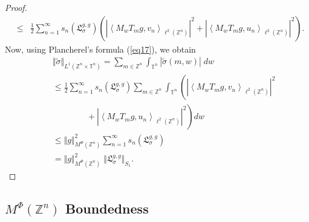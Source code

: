 \documentclass[a4paper,11pt, reqno]{amsart}
\theoremstyle{plain}
\theoremstyle{definition}
\theoremstyle{remark}
\def \Z{{\mathbb Z}}
\def \T{{\mathbb T}}
\begin{document}
\begin{proof}
\begin{eqnarray*}
& \leq & \frac{1}{2} \sum_{n=1}^{\infty} s_n(\mathfrak{L}^{g, g}_{\sigma}) \left( \left| \left\langle  M_w T_m g, v_n \right\rangle_{\ell^2(\Z^n)}  \right|^2 + \left| \left\langle  M_w T_m g, u_n  \right\rangle_{\ell^2(\Z^n)} \right|^2 \right). 
\end{eqnarray*}  
Now, using Plancherel's formula (\ref{eq17}), we obtain
\begin{eqnarray*}
&& \Vert \tilde{\sigma} \Vert_{L^1(\Z^n \times \T^n)} 
= \sum_{m \in \Z^n}  \int_{\T^n} |\tilde{\sigma}(m, w)| \; dw  \\
&& \leq \frac{1}{2} \sum_{n=1}^{\infty} s_n(\mathfrak{L}^{g, g}_{\sigma}) \sum_{m \in \Z^n} \int_{\T^n} \left(  \left| \left\langle  M_w T_m g, v_n \right\rangle_{\ell^2(\Z^n)} \right|^2  \right. \\
&& \qquad \qquad   + \left. \left| \left\langle  M_w T_m g, u_n  \right\rangle_{\ell^2(\Z^n)} \right|^2  \right) dw  \\
&& \leq  \Vert g \Vert^2_{M^{\Phi}(\Z^n)} \sum_{n=1}^{\infty} s_n(\mathfrak{L}^{g, g}_{\sigma})  \\
&& = \Vert g \Vert^2_{M^{\Phi}(\Z^n)} \; \Vert \mathfrak{L}^{g, g}_{\sigma} \Vert_{S_1} .
\end{eqnarray*}
\end{proof} 

\subsection{$M^{\Phi}(\Z^n)$ Boundedness} 
 
\end{document}
